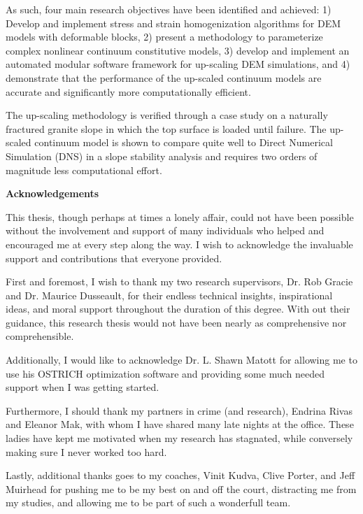 As such, four main research objectives have been identified and achieved: 1) Develop and implement stress and strain homogenization algorithms for DEM models with deformable blocks, 2) present a methodology to parameterize complex nonlinear continuum constitutive models, 3) develop and implement an automated modular software framework for up-scaling DEM simulations, and 4) demonstrate that the performance of the up-scaled continuum models are accurate and significantly more computationally efficient.

The up-scaling methodology is verified through a case study on a naturally fractured granite slope in which the top surface is loaded until failure. The up-scaled continuum model is shown to compare quite well to Direct Numerical Simulation (DNS) in a slope stability analysis and requires two orders of magnitude less computational effort.

\cleardoublepage


\begin{center}\textbf{Acknowledgements}\end{center}

This thesis, though perhaps at times a lonely affair, could not have been possible without the involvement and support of many individuals who helped and encouraged me at every step along the way. I wish to acknowledge the invaluable support and contributions that everyone provided. 

First and foremost, I wish to thank my two research supervisors, Dr. Rob Gracie and Dr. Maurice Dusseault, for their endless technical insights, inspirational ideas, and moral support throughout the duration of this degree. With out their guidance, this research thesis would not have been nearly as comprehensive nor comprehensible.

Additionally, I would like to acknowledge Dr. L. Shawn Matott for allowing me to use his OSTRICH optimization software and providing some much needed support when I was getting started. 

Furthermore, I should thank my partners in crime (and research), Endrina Rivas and Eleanor Mak, with whom I have shared many late nights at the office. These ladies have kept me motivated when my research has stagnated, while conversely making sure I never worked too hard. 

Lastly, additional thanks goes to my coaches, Vinit Kudva, Clive Porter, and Jeff Muirhead for pushing me to be my best on and off the court, distracting me from my studies, and allowing me to be part of such a wonderfull team.

